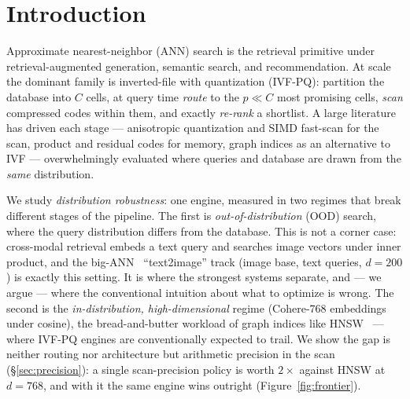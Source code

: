 \documentclass{article}
\begin{document}
\begin{abstract}
resulting noise grows as $\sqrt{m}$ with subspace count --- harmless at $m{=}100$
($d{=}200$, wide OOD margins), fatal at $m{=}384$ ($d{=}768$, small cosine margins),
where it collapses in-pool ordering to $0.07$; an int16 scan of the \emph{same codes}
restores ordering to the pool ceiling ($0.87$), so the engine auto-selects scan
precision by $m$. The coverage graph is \emph{self-built}: an internal NN-descent
pass reaches $0.90$ overlap@16 at 10M in minutes --- less than HNSW's own index build
time --- because local join never routes, sidestepping the $d{=}768$ coverage cap
that binds routed self-search. All comparisons are same-hardware sequential pairs,
and the measurement methodology is treated as a contribution.
\end{abstract}

\section{Introduction}
\label{sec:intro}
Approximate nearest-neighbor (ANN) search is the retrieval primitive under
retrieval-augmented generation, semantic search, and recommendation. At scale the
dominant family is inverted-file with quantization (IVF-PQ): partition the database
into $C$ cells, at query time \emph{route} to the $p\!\ll\!C$ most promising cells,
\emph{scan} compressed codes within them, and exactly \emph{re-rank} a shortlist. A
large literature has driven each stage --- anisotropic quantization and SIMD
fast-scan for the scan, product and residual codes for memory, graph indices as an
alternative to IVF --- overwhelmingly evaluated where queries and database are drawn
from the \emph{same} distribution.

We study \emph{distribution robustness}: one engine, measured in two regimes that
break different stages of the pipeline. The first is \emph{out-of-distribution}
(OOD) search, where the query distribution differs from the database. This is not
a corner case: cross-modal retrieval embeds a text query and searches image
vectors under inner product, and the big-ANN~\cite{bigann} ``text2image'' track (image base,
text queries, $d{=}200$) is exactly this setting. It is where the strongest
systems separate, and --- we argue --- where the conventional intuition about what
to optimize is wrong. The second is the \emph{in-distribution, high-dimensional}
regime (Cohere-768 embeddings under cosine), the bread-and-butter workload of
graph indices like HNSW~\cite{hnsw} --- where IVF-PQ engines are conventionally
expected to trail. We show the gap is neither routing nor architecture but
arithmetic precision in the scan (\S\ref{sec:precision}): a single scan-precision
policy is worth $2\times$ against HNSW at $d{=}768$, and with it the same engine
wins outright (Figure~\ref{fig:frontier}).
\end{document}
